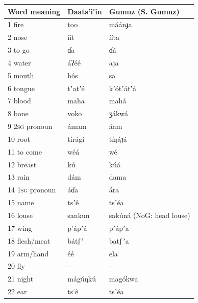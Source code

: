\documentclass[output=paper]{langsci/langscibook}
\begin{document}
\begin{longtable}{p{}  p{} p{}}
\lsptoprule
Word meaning & Daats’i\'{ }in & Gumuz (S. Gumuz)\\
\midrule
1 fire & too & máánɟa \\

2 nose & íít & ííta \\

3 to go & ɗa & ɗá \\

4 water & áʔéé & aja \\

5 mouth & h\'{o}s & sa \\

6 tongue & tʼatʼé & kʼ\'{o}tʼátʼá \\

7 blood & maha & mahá \\

8 bone & voko & ʒákwá \\

9 2\textsc{sg} pronoun & ámam & áam \\

10 root & tírágí & tíŋáɟá \\

11 to come & wéá & wé \\

12 breast & k\'{u} & k\'{u}á \\

13 rain & dám & dama \\

14 1\textsc{sg} pronoun & áɗa & ára \\

15 name & tsʼ\^{e} & tsʼéa \\

16 louse & sankun & sak\'{u}ná (NoG: head louse) \\

17 wing & p’ápʼá & pʼápʼa \\

18 flesh/meat & bátʃ\,ʼ & batʃ\,ʼa \\

19 arm/hand & éé & ela \\

20 fly & -- & -- \\

21 night & mág\'{u}ŋk\'{u} & mag\'{o}kwa \\

22 ear & ts‘\^{e} & tsʼéa \\


\end{longtable}
\end{document}
